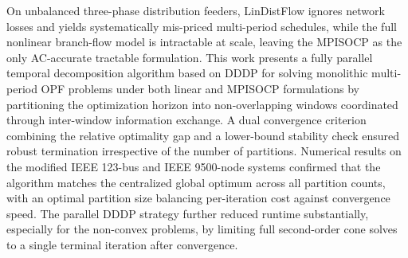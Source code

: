 On unbalanced three-phase distribution feeders, LinDistFlow ignores network
losses and yields systematically mis-priced multi-period schedules, while
the full nonlinear branch-flow model is intractable at scale, leaving the
MPISOCP as the only AC-accurate tractable formulation.
This work presents a fully parallel temporal decomposition algorithm based on
DDDP for solving monolithic multi-period OPF problems under both linear and
MPISOCP formulations by partitioning the optimization horizon into
non-overlapping windows coordinated through inter-window information exchange.
A dual convergence criterion combining the relative optimality gap and a
lower-bound stability check ensured robust termination irrespective of the
number of partitions. Numerical results on the modified IEEE 123-bus and
IEEE 9500-node systems confirmed that the algorithm matches the centralized
global optimum across all partition counts, with an optimal partition size
balancing per-iteration cost against convergence speed. The parallel DDDP
strategy further reduced runtime substantially, especially for the non-convex
problems, by limiting full second-order cone solves to a single terminal
iteration after convergence.
